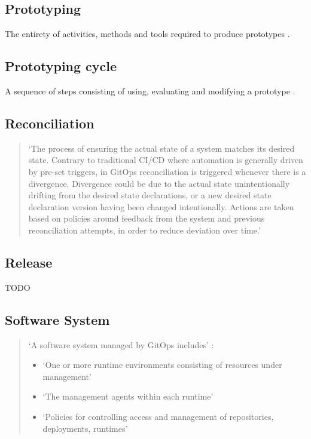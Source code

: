 \subsection*{Prototyping}
The entirety of activities, methods and tools required to produce prototypes
\autocite{riedlManagementInformatik2019}.

\subsection*{Prototyping cycle}
A sequence of steps consisting of using, evaluating and modifying a prototype
\autocite{riedlManagementInformatik2019}.





\subsection*{Reconciliation}
\begin{quotation}
\noindent
\enquote*{The process of ensuring the actual state of a system matches its desired state. Contrary to traditional CI/CD where automation is generally driven by pre-set triggers, in GitOps reconciliation is triggered whenever there is a divergence. Divergence could be due to the actual state unintentionally drifting from the desired state declarations, or a new desired state declaration version having been changed intentionally. Actions are taken based on policies around feedback from the system and previous reconciliation attempts, in order to reduce deviation over time.}
\autocite{gitopsGlossary}
\end{quotation}

\subsection*{Release}
TODO

\subsection*{Software System}
\begin{quotation}
\noindent
\enquote*{A software system managed by GitOps includes} \autocite{gitopsGlossary}:
\begin{itemize}
	\item \enquote*{One or more runtime environments consisting of resources under management}
	\item \enquote*{The management agents within each runtime}
	\item \enquote*{Policies for controlling access and management of repositories, deployments, runtimes}
	\autocite{gitopsGlossary}
\end{itemize}
\end{quotation}

